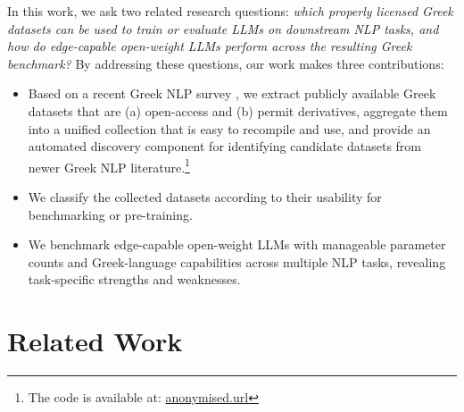 \documentclass[sigconf,review,anonymous]{acmart}
\begin{document}
In this work, we ask two related research questions: \emph{which properly licensed Greek datasets can be used to train or evaluate LLMs on downstream NLP tasks, and how do edge-capable open-weight LLMs perform across the resulting Greek benchmark?}
By addressing these questions, our work makes three contributions:
\begin{itemize}
    \item Based on a recent Greek NLP survey \cite{bakagianni2025systematic}, we extract publicly available Greek datasets that are (a) open-access and (b) permit derivatives, aggregate them into a unified collection that is easy to recompile and use, and provide an automated discovery component for identifying candidate datasets from newer Greek NLP literature.\footnote{The code is available at: \url{anonymised.url}}
    \item We classify the collected datasets according to their usability for benchmarking or pre-training.
    \item We benchmark edge-capable open-weight LLMs with manageable parameter counts and Greek-language capabilities across multiple NLP tasks, revealing task-specific strengths and weaknesses.
\end{itemize}

\section{Related Work}
\end{document}
